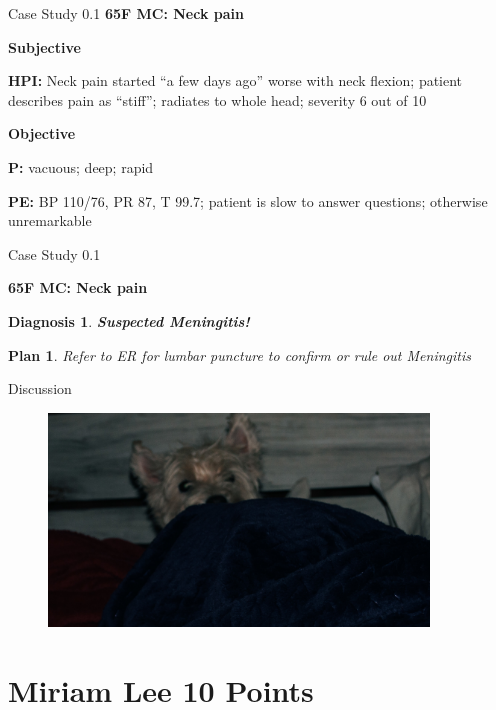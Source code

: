 \begin{frame}{Case Study 0.1} %
  \textbf{\Large 65F MC: Neck pain}
  
  \textbf{\large Subjective}
  
  \textbf{HPI:} Neck pain started ``a few days ago'' worse with neck flexion; patient describes pain as ``stiff''; radiates to whole head; severity 6 out of 10

  \textbf{\large Objective}
  
  \textbf{P:} vacuous; deep; rapid

  \textbf{PE:} BP 110/76, PR 87, T 99.7; patient is slow to answer questions; otherwise unremarkable

\end{frame}

\begin{frame}{Case Study 0.1} %
  \newtheorem{dx}{Diagnosis}
  \newtheorem{pln}{Plan}
  \textbf{\Large 65F MC: Neck pain}

  \begin{dx}
    \textbf{Suspected Meningitis!}
  \end{dx}

  \begin{pln}
    Refer to ER for lumbar puncture to confirm or rule out Meningitis
  \end{pln}

\end{frame}
  
\begin{frame}{Discussion}
  \begin{figure}
    \centering
    \includegraphics[width=0.9\textwidth]{img/westie02.jpg}
  \end{figure}
\end{frame}

\section{Miriam Lee 10 Points}          

